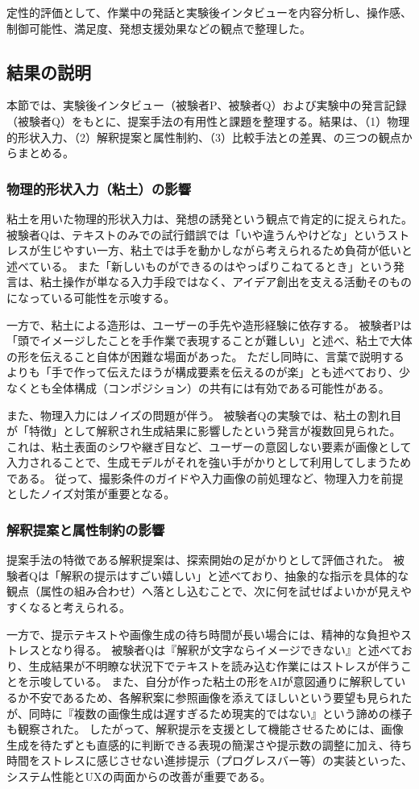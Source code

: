 \documentclass{kuisthesis}
\begin{document}
定性的評価として、作業中の発話と実験後インタビューを内容分析し、操作感、制御可能性、満足度、発想支援効果などの観点で整理した。

\subsection{結果の説明}
本節では、実験後インタビュー（被験者P、被験者Q）および実験中の発言記録（被験者Q）をもとに、提案手法の有用性と課題を整理する。結果は、（1）物理的形状入力、（2）解釈提案と属性制約、（3）比較手法との差異、の三つの観点からまとめる。

\subsubsection{物理的形状入力（粘土）の影響}
粘土を用いた物理的形状入力は、発想の誘発という観点で肯定的に捉えられた。
被験者Qは、テキストのみでの試行錯誤では「いや違うんやけどな」というストレスが生じやすい一方、粘土では手を動かしながら考えられるため負荷が低いと述べている。
また「新しいものができるのはやっぱりこねてるとき」という発言は、粘土操作が単なる入力手段ではなく、アイデア創出を支える活動そのものになっている可能性を示唆する。

一方で、粘土による造形は、ユーザーの手先や造形経験に依存する。
被験者Pは「頭でイメージしたことを手作業で表現することが難しい」と述べ、粘土で大体の形を伝えること自体が困難な場面があった。
ただし同時に、言葉で説明するよりも「手で作って伝えたほうが構成要素を伝えるのが楽」とも述べており、少なくとも全体構成（コンポジション）の共有には有効である可能性がある。

また、物理入力にはノイズの問題が伴う。
被験者Qの実験では、粘土の割れ目が「特徴」として解釈され生成結果に影響したという発言が複数回見られた。
これは、粘土表面のシワや継ぎ目など、ユーザーの意図しない要素が画像として入力されることで、生成モデルがそれを強い手がかりとして利用してしまうためである。
従って、撮影条件のガイドや入力画像の前処理など、物理入力を前提としたノイズ対策が重要となる。

\subsubsection{解釈提案と属性制約の影響}
提案手法の特徴である解釈提案は、探索開始の足がかりとして評価された。
被験者Qは「解釈の提示はすごい嬉しい」と述べており、抽象的な指示を具体的な観点（属性の組み合わせ）へ落とし込むことで、次に何を試せばよいかが見えやすくなると考えられる。

一方で、提示テキストや画像生成の待ち時間が長い場合には、精神的な負担やストレスとなり得る。 
被験者Qは『解釈が文字ならイメージできない』と述べており、生成結果が不明瞭な状況下でテキストを読み込む作業にはストレスが伴うことを示唆している。
また、自分が作った粘土の形をAIが意図通りに解釈しているか不安であるため、各解釈案に参照画像を添えてほしいという要望も見られたが、同時に『複数の画像生成は遅すぎるため現実的ではない』という諦めの様子も観察された。
したがって、解釈提示を支援として機能させるためには、画像生成を待たずとも直感的に判断できる表現の簡潔さや提示数の調整に加え、待ち時間をストレスに感じさせない進捗提示（プログレスバー等）の実装といった、システム性能とUXの両面からの改善が重要である。
\end{document}
